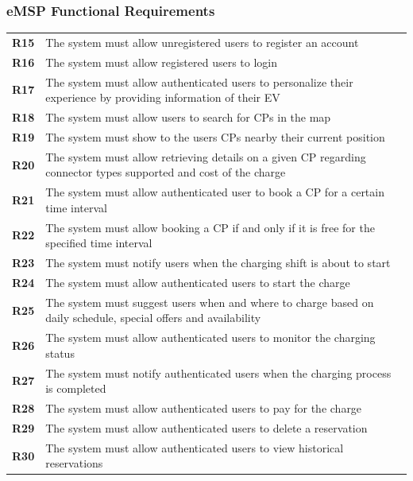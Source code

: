 \subsubsection{eMSP Functional Requirements}
\begin{table}[H]
    \begin{tabularx}{\textwidth}{cX}
        \toprule
        \textbf{R15} & The system must allow unregistered users to register an account                                                   \\
        \textbf{R16} & The system must allow registered users to login                                                                   \\
        \textbf{R17} & The system must allow authenticated users to personalize their experience by providing information of their EV    \\
        \textbf{R18} & The system must allow users to search for CPs in the map                                                          \\
        \textbf{R19} & The system must show to the users CPs nearby their current position                                               \\
        \textbf{R20} & The system must allow retrieving details on a given CP regarding connector types supported and cost of the charge \\
        \textbf{R21} & The system must allow authenticated user to book a CP for a certain time interval                                 \\
        \textbf{R22} & The system must allow booking a CP if and only if it is free for the specified time interval                      \\
        \textbf{R23} & The system must notify users when the charging shift is about to start                                            \\
        \textbf{R24} & The system must allow authenticated users to start the charge                                                     \\
        \textbf{R25} & The system must suggest users when and where to charge based on daily schedule, special offers and availability   \\
        \textbf{R26} & The system must allow authenticated users to monitor the charging status                                          \\
        \textbf{R27} & The system must notify authenticated users when the charging process is completed                                 \\
        \textbf{R28} & The system must allow authenticated users to pay for the charge                                                   \\
        \textbf{R29} & The system must allow authenticated users to delete a reservation                                                 \\
        \textbf{R30} & The system must allow authenticated users to view historical reservations                                         \\ \bottomrule
    \end{tabularx}
\end{table}

